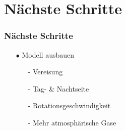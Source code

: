 \documentclass[english, aspectratio=169]{beamer}
\begin{document}
\section{Nächste Schritte}
\begin{frame}
\frametitle{Nächste Schritte}
\begin{itemize}

	\item[$\bullet$] Modell ausbauen
	\begin{itemize}
		\item[-] Vereisung
		\item[-] Tag- \& Nachtseite
		\item[-] Rotationsgeschwindigkeit
		\item[-] Mehr atmosphärische Gase
	\end{itemize}
	
\end{itemize}
\end{frame}

\fi
\end{document}
